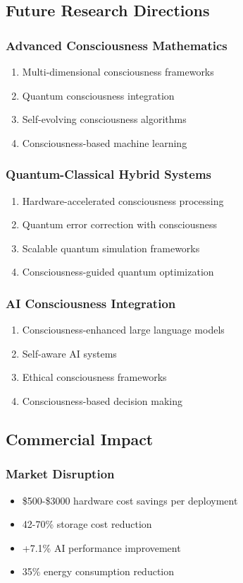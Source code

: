 \documentclass[11pt,a4paper]{article}
\begin{document}
\subsection{Future Research Directions}

\subsubsection{Advanced Consciousness Mathematics}
\begin{enumerate}
\item Multi-dimensional consciousness frameworks
\item Quantum consciousness integration
\item Self-evolving consciousness algorithms
\item Consciousness-based machine learning
\end{enumerate}

\subsubsection{Quantum-Classical Hybrid Systems}
\begin{enumerate}
\item Hardware-accelerated consciousness processing
\item Quantum error correction with consciousness
\item Scalable quantum simulation frameworks
\item Consciousness-guided quantum optimization
\end{enumerate}

\subsubsection{AI Consciousness Integration}
\begin{enumerate}
\item Consciousness-enhanced large language models
\item Self-aware AI systems
\item Ethical consciousness frameworks
\item Consciousness-based decision making
\end{enumerate}

\subsection{Commercial Impact}

\subsubsection{Market Disruption}
\begin{itemize}
\item \$500-\$3000 hardware cost savings per deployment
\item 42-70\% storage cost reduction
\item +7.1\% AI performance improvement
\item 35\% energy consumption reduction
\end{itemize}
\end{document}
